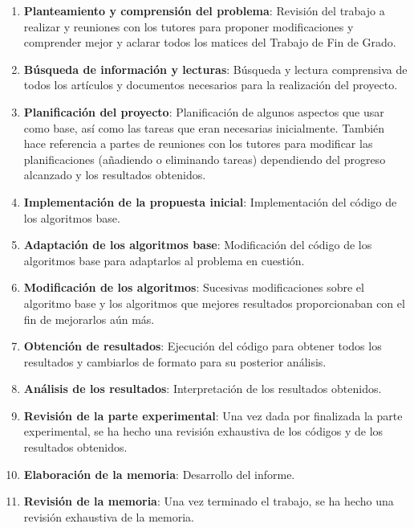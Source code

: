 \begin{enumerate}
	\item \textbf{Planteamiento y comprensión del problema}: Revisión del trabajo a realizar y reuniones con los tutores para proponer modificaciones y comprender mejor y aclarar todos los matices del Trabajo de Fin de Grado.
	
	\item \textbf{Búsqueda de información y lecturas}: Búsqueda y lectura comprensiva de todos los artículos y documentos necesarios para la realización del proyecto.
	
	\item \textbf{Planificación del proyecto}: Planificación de algunos aspectos que usar como base, así como las tareas que eran necesarias inicialmente. 
También hace referencia a partes de reuniones con los tutores para modificar las planificaciones (añadiendo o eliminando tareas) dependiendo del progreso alcanzado y los resultados obtenidos.
	
	\item \textbf{Implementación de la propuesta inicial}: Implementación del código de los algoritmos base.
	
	\item \textbf{Adaptación de los algoritmos base}: Modificación del código de los algoritmos base para adaptarlos al problema en cuestión.
	
	\item \textbf{Modificación de los algoritmos}: Sucesivas modificaciones sobre el algoritmo base y los algoritmos que mejores resultados proporcionaban con el fin de mejorarlos aún más.
	
	\item \textbf{Obtención de resultados}: Ejecución del código para obtener todos los resultados y cambiarlos de formato para su posterior análisis.
	
	\item \textbf{Análisis de los resultados}: Interpretación de los resultados obtenidos.
	
	\item \textbf{Revisión de la parte experimental}: Una vez dada por finalizada la parte experimental, se ha hecho una revisión exhaustiva de los códigos y de los resultados obtenidos.
	
	\item \textbf{Elaboración de la memoria}: Desarrollo del informe.
	
	\item \textbf{Revisión de la memoria}: Una vez terminado el trabajo, se ha hecho una revisión exhaustiva de la memoria.
\end{enumerate}

